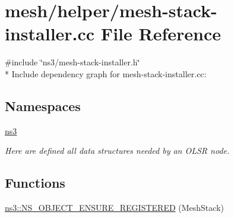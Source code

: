 \hypertarget{mesh-stack-installer_8cc}{}\section{mesh/helper/mesh-\/stack-\/installer.cc File Reference}
\label{mesh-stack-installer_8cc}
{\ttfamily \#include \char`\"{}ns3/mesh-\/stack-\/installer.\+h\char`\"{}}\\*
Include dependency graph for mesh-\/stack-\/installer.cc\+:
\subsection*{Namespaces}
\begin{DoxyCompactItemize}
\item 
 \hyperlink{namespacens3}{ns3}
\begin{DoxyCompactList}\small\item\em Here are defined all data structures needed by an O\+L\+SR node. \end{DoxyCompactList}\end{DoxyCompactItemize}
\subsection*{Functions}
\begin{DoxyCompactItemize}
\item 
\hyperlink{namespacens3_a0510ef7bfb0f5f12e669d416579b7c4c}{ns3\+::\+N\+S\+\_\+\+O\+B\+J\+E\+C\+T\+\_\+\+E\+N\+S\+U\+R\+E\+\_\+\+R\+E\+G\+I\+S\+T\+E\+R\+ED} (Mesh\+Stack)
\end{DoxyCompactItemize}
